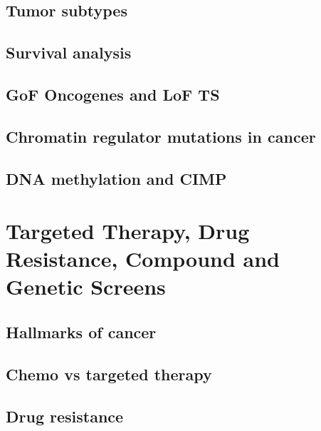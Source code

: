 \documentclass[
]{book}
\begin{document}
\hypertarget{tumor-subtypes}{%
\section{Tumor subtypes}\label{tumor-subtypes}}

\hypertarget{survival-analysis}{%
\section{Survival analysis}\label{survival-analysis}}

\hypertarget{gof-oncogenes-and-lof-ts}{%
\section{GoF Oncogenes and LoF TS}\label{gof-oncogenes-and-lof-ts}}

\hypertarget{chromatin-regulator-mutations-in-cancer}{%
\section{Chromatin regulator mutations in cancer}\label{chromatin-regulator-mutations-in-cancer}}

\hypertarget{dna-methylation-and-cimp}{%
\section{DNA methylation and CIMP}\label{dna-methylation-and-cimp}}

\hypertarget{tt}{%
\chapter{Targeted Therapy, Drug Resistance, Compound and Genetic Screens}\label{tt}}

\hypertarget{hallmarks-of-cancer}{%
\section{Hallmarks of cancer}\label{hallmarks-of-cancer}}

\hypertarget{chemo-vs-targeted-therapy}{%
\section{Chemo vs targeted therapy}\label{chemo-vs-targeted-therapy}}

\hypertarget{drug-resistance}{%
\section{Drug resistance}\label{drug-resistance}}
\end{document}
